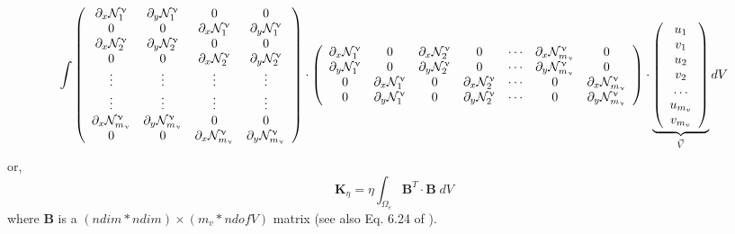 \[
\int
\left(
\begin{array}{cccc}
\partial_x {\mathcal{N}}_1^\upnu & \partial_y {\mathcal{N}}_1^\upnu & 0 & 0 \\ 
0 & 0 & \partial_x {\mathcal{N}}_1^\upnu & \partial_y {\mathcal{N}}_1^\upnu  \\ 
\partial_x {\mathcal{N}}_2^\upnu & \partial_y {\mathcal{N}}_2^\upnu & 0 & 0 \\ 
0 & 0 & \partial_x {\mathcal{N}}_2^\upnu & \partial_y {\mathcal{N}}_2^\upnu  \\ 
\vdots & \vdots & \vdots & \vdots \\
\vdots & \vdots & \vdots & \vdots \\
\partial_x {\mathcal{N}}_{m_\upnu}^\upnu & \partial_y {\mathcal{N}}_{m_\upnu}^\upnu & 0 & 0 \\ 
0 & 0 & \partial_x {\mathcal{N}}_{m_\upnu}^\upnu & \partial_y {\mathcal{N}}_{m_\upnu}^\upnu  \\ 
\end{array}
\right)
\cdot
\left(
\begin{array}{cccccccccc}
\partial_x {\mathcal{N}}_1^\upnu & 0  & \partial_x {\mathcal{N}}_2^\upnu & 0  & \cdots & \partial_x {\mathcal{N}}^\upnu_{m_\upnu} & 0 \\
\partial_y {\mathcal{N}}_1^\upnu & 0  & \partial_y {\mathcal{N}}_2^\upnu & 0  & \cdots & \partial_y {\mathcal{N}}^\upnu_{m_\upnu} & 0 \\
0 & \partial_x {\mathcal{N}}_1^\upnu  & 0& \partial_x {\mathcal{N}}_2^\upnu  & \cdots & 0 & \partial_x {\mathcal{N}}^\upnu_{m_\upnu}  \\
0 & \partial_y {\mathcal{N}}_1^\upnu  & 0& \partial_y {\mathcal{N}}_2^\upnu  & \cdots & 0 & \partial_y {\mathcal{N}}^\upnu_{m_\upnu}  
\end{array}
\right) 
\cdot
\underbrace{
\left(
\begin{array}{c}
u_1 \\ v_1 \\ u_2 \\ v_2 \\ \dots \\ u_{m_v} \\ v_{m_v} 
\end{array}
\right) }_{\vec V}
dV
\]
or, 
\[
{\bm K}_\eta= \eta \int_{\Omega_e} {\bm B}^T  \cdot {\bm B} \; dV 
\]
where ${\bm B}$ is a $(ndim*ndim) \times (m_v*ndofV)$ matrix (see also Eq. 6.24 of \textcite{dohu03}). 

